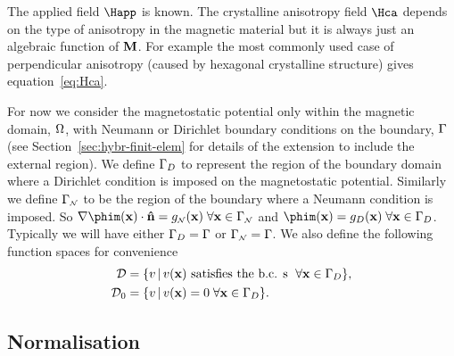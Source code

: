 The applied field $\Happ$ is known. The crystalline anisotropy field $\Hca$ depends on the type of anisotropy in the magnetic material but it is always just an algebraic function of $\mathbf{M}$. For example the most commonly used case of perpendicular anisotropy (caused by hexagonal crystalline structure) gives equation~\eqref{eq:Hca}.

For now we consider the magnetostatic potential only within the magnetic domain, $\Omega$, with Neumann or Dirichlet boundary conditions on the boundary, ${\Gamma}$ (see Section~\ref{sec:hybr-finit-elem} for details of the extension to include the external region). We define ${\Gamma}_D$ to represent the region of the boundary domain where a Dirichlet condition is imposed on the magnetostatic potential. Similarly we define ${\Gamma}_{\scriptscriptstyle{\mathcal{N}}}$ to be the region of the boundary where a Neumann condition is imposed. So $ \nabla \phim(\xv) \cdot \nv = g_\Neu(\xv) \; \forall \xv \in \boundd_\Neu$ and $\phim(\xv) = g_D(\xv) \; \forall \xv \in \boundd_D$. Typically we will have either ${\Gamma}_D = {\Gamma}$ or ${\Gamma}_{\scriptscriptstyle{\mathcal{N}}} = {\Gamma}$. We also define the following function spaces for convenience
\begin{align}
  \label{eq:037}
  \mathcal{D} & = \{ v \,|\, v(\mathbf{x}) \text{ satisfies the b.c. s } \; \forall \mathbf{x} \in {\Gamma}_D \}, \\
  \mathcal{D}_0 &= \{ v \,|\, v(\mathbf{x}) = 0 \; \forall \mathbf{x} \in {\Gamma}_D \}.
\end{align}

\subsection{Normalisation}
\label{sec:normalisation}


